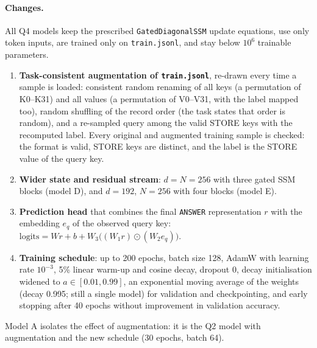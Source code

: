 \documentclass[11pt,a4paper]{article}
\begin{document}
\paragraph{Changes.}
All Q4 models keep the prescribed \texttt{GatedDiagonalSSM} update
equations, use only token inputs, are trained only on
\texttt{train.jsonl}, and stay below $10^6$ trainable parameters.
\begin{enumerate}
    \item \textbf{Task-consistent augmentation of \texttt{train.jsonl}},
          re-drawn every time a sample is loaded: consistent random
          renaming of all keys (a permutation of K0--K31) and all values
          (a permutation of V0--V31, with the label mapped too), random
          shuffling of the record order (the task states that order is
          random), and a re-sampled query among the valid STORE keys with
          the recomputed label. Every original and augmented training
          sample is checked: the format is valid, STORE keys are distinct,
          and the label is the STORE value of the query key.
    \item \textbf{Wider state and residual stream}: $d=N=256$ with three
          gated SSM blocks (model D), and $d=192$, $N=256$ with four
          blocks (model E).
    \item \textbf{Prediction head} that combines the final
          \texttt{ANSWER} representation $r$ with the embedding $e_q$ of
          the observed query key:
          $\text{logits}=Wr+b+W_3\bigl((W_1r)\odot(W_2e_q)\bigr)$.
    \item \textbf{Training schedule}: up to 200 epochs, batch size 128,
          AdamW with learning rate $10^{-3}$, 5\% linear warm-up and
          cosine decay, dropout 0, decay initialisation widened to
          $a\in[0.01,0.99]$, an exponential moving average of the weights
          (decay 0.995; still a single model) for validation and
          checkpointing, and early stopping after 40 epochs without
          improvement in validation accuracy.
\end{enumerate}
Model A isolates the effect of augmentation: it is the Q2 model with
augmentation and the new schedule (30 epochs, batch 64).
\end{document}
